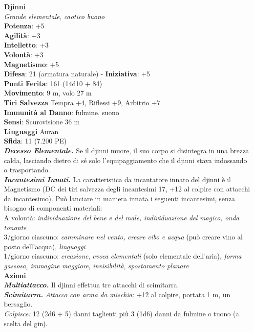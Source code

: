 \begin{multicols}{2}
\medskip\textbf{Djinni}\\
\emph{Grande elementale, caotico buono}\\
\textbf{Potenza}: +5\\
\textbf{Agilità}: +3\\
\textbf{Intelletto}: +3\\
\textbf{Volontà}: +3\\
\textbf{Magnetismo}: +5\\
\textbf{Difesa}: 21 (armatura naturale) - \textbf{Iniziativa}: +5\\
\textbf{Punti Ferita}: 161 (14d10 + 84)\\
\textbf{Movimento}: 9 m, volo 27 m\\
\textbf{Tiri Salvezza} Tempra +4, Riflessi +9, Arbitrio +7\\
\textbf{Immunità al Danno}: fulmine, suono\\
\textbf{Sensi}: Scurovisione 36 m\\
\textbf{Linguaggi} Auran\\
\textbf{Sfida}: 11 (7.200 PE)\smallskip\\
\emph{\textbf{Decesso Elementale.}} Se il djinni muore, il suo corpo si disintegra in una brezza calda, lasciando dietro di sé solo l'equipaggiamento che il djinni stava indossando o trasportando.\\
\emph{\textbf{Incantesimi Innati.}} La caratteristica da incantatore innato del djinni è il Magnetismo (DC dei tiri salvezza degli incantesimi 17, +12 al colpire con attacchi da incantesimo). Può lanciare in maniera innata i seguenti incantesimi, senza bisogno di componenti materiali: \\
A volontà: \emph{individuazione del bene e del male, individuazione del} \emph{magico, onda tonante}\\
3/giorno ciascuno: \emph{camminare nel vento, creare cibo e acqua} (può creare vino al posto dell'acqua), \emph{linguaggi}\\
1/giorno ciascuno: \emph{creazione}, \emph{evoca elementali} (solo elementale dell'aria), \emph{forma gassosa, immagine maggiore}, \emph{invisibilità,} \emph{spostamento planare}\\
\smallskip\textbf{Azioni}\\
\emph{\textbf{Multiattacco.}} Il djinni effettua tre attacchi di scimitarra.\\
\emph{\textbf{Scimitarra.} Attacco con arma da mischia}: +12 al colpire, portata 1 m, un bersaglio.\\
\emph{Colpisce:} 12 (2d6 + 5) danni taglienti più 3 (1d6) danni da fulmine o tuono (a scelta del gin).\\

\end{multicols}
